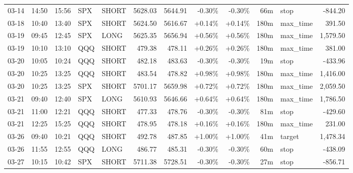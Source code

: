\documentclass[11pt,a4paper]{article}
\begin{document}
\begin{center}
\begin{longtable}{>{\color{txtmain}}l l l l l r r r r r >{\color{txtmain}}l r}
03-14 & 14:50 & 15:56 & SPX & SHORT & 5628.03 & 5644.91 & \textcolor{lossred}{-0.30\%} & \textcolor{lossred}{-0.30\%} & 66m & stop & \textcolor{lossred}{-844.20} \\
03-18 & 10:40 & 13:40 & SPX & SHORT & 5624.50 & 5616.67 & \textcolor{wingreen}{+0.14\%} & \textcolor{wingreen}{+0.14\%} & 180m & max\_time & \textcolor{wingreen}{391.50} \\
03-19 & 09:45 & 12:45 & SPX & LONG & 5625.35 & 5656.94 & \textcolor{wingreen}{+0.56\%} & \textcolor{wingreen}{+0.56\%} & 180m & max\_time & \textcolor{wingreen}{1,579.50} \\
03-19 & 10:10 & 13:10 & QQQ & SHORT & 479.38 & 478.11 & \textcolor{wingreen}{+0.26\%} & \textcolor{wingreen}{+0.26\%} & 180m & max\_time & \textcolor{wingreen}{381.00} \\
03-20 & 10:05 & 10:24 & QQQ & SHORT & 482.18 & 483.63 & \textcolor{lossred}{-0.30\%} & \textcolor{lossred}{-0.30\%} & 19m & stop & \textcolor{lossred}{-433.96} \\
03-20 & 10:25 & 13:25 & QQQ & SHORT & 483.54 & 478.82 & \textcolor{wingreen}{+0.98\%} & \textcolor{wingreen}{+0.98\%} & 180m & max\_time & \textcolor{wingreen}{1,416.00} \\
03-20 & 10:25 & 13:25 & SPX & SHORT & 5701.17 & 5659.98 & \textcolor{wingreen}{+0.72\%} & \textcolor{wingreen}{+0.72\%} & 180m & max\_time & \textcolor{wingreen}{2,059.50} \\
03-21 & 09:40 & 12:40 & SPX & LONG & 5610.93 & 5646.66 & \textcolor{wingreen}{+0.64\%} & \textcolor{wingreen}{+0.64\%} & 180m & max\_time & \textcolor{wingreen}{1,786.50} \\
03-21 & 11:00 & 12:21 & QQQ & SHORT & 477.33 & 478.76 & \textcolor{lossred}{-0.30\%} & \textcolor{lossred}{-0.30\%} & 81m & stop & \textcolor{lossred}{-429.60} \\
03-21 & 12:25 & 15:25 & QQQ & SHORT & 478.95 & 478.18 & \textcolor{wingreen}{+0.16\%} & \textcolor{wingreen}{+0.16\%} & 180m & max\_time & \textcolor{wingreen}{231.00} \\
03-26 & 09:40 & 10:21 & QQQ & SHORT & 492.78 & 487.85 & \textcolor{wingreen}{+1.00\%} & \textcolor{wingreen}{+1.00\%} & 41m & target & \textcolor{wingreen}{1,478.34} \\
03-26 & 11:55 & 12:55 & QQQ & LONG & 486.77 & 485.31 & \textcolor{lossred}{-0.30\%} & \textcolor{lossred}{-0.30\%} & 60m & stop & \textcolor{lossred}{-438.09} \\
03-27 & 10:15 & 10:42 & SPX & SHORT & 5711.38 & 5728.51 & \textcolor{lossred}{-0.30\%} & \textcolor{lossred}{-0.30\%} & 27m & stop & \textcolor{lossred}{-856.71} \\

\end{longtable}
\end{center}
\end{document}
